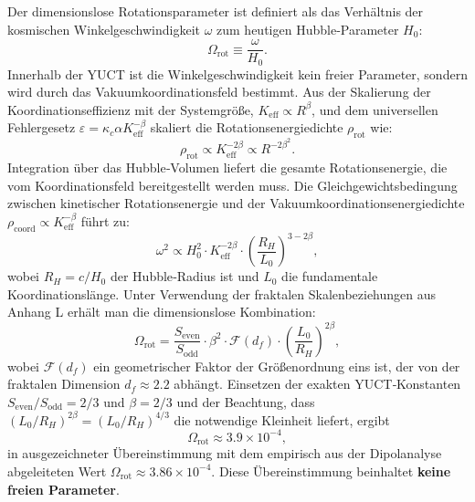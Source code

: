 \documentclass[11pt,a4paper]{article}
\begin{document}
	Der dimensionslose Rotationsparameter ist definiert als das Verhältnis der kosmischen Winkelgeschwindigkeit \(\omega\) zum heutigen Hubble‑Parameter \(H_0\):
	\begin{equation}
		\Omega_{\mathrm{rot}} \equiv \frac{\omega}{H_0}.
	\end{equation}
	Innerhalb der YUCT ist die Winkelgeschwindigkeit kein freier Parameter, sondern wird durch das Vakuumkoordinationsfeld bestimmt. Aus der Skalierung der Koordinationseffizienz mit der Systemgröße, \(K_{\mathrm{eff}} \propto R^{\beta}\), und dem universellen Fehlergesetz \(\varepsilon = \kappa_c \alpha K_{\mathrm{eff}}^{-\beta}\) skaliert die Rotationsenergiedichte \(\rho_{\mathrm{rot}}\) wie:
	\begin{equation}
		\rho_{\mathrm{rot}} \propto K_{\mathrm{eff}}^{-2\beta} \propto R^{-2\beta^2}.
	\end{equation}
	Integration über das Hubble‑Volumen liefert die gesamte Rotationsenergie, die vom Koordinationsfeld bereitgestellt werden muss. Die Gleichgewichtsbedingung zwischen kinetischer Rotationsenergie und der Vakuumkoordinationsenergiedichte \(\rho_{\mathrm{coord}} \propto K_{\mathrm{eff}}^{-\beta}\) führt zu:
	\begin{equation}
		\omega^2 \propto H_0^2 \cdot K_{\mathrm{eff}}^{-2\beta} \cdot \left(\frac{R_H}{L_0}\right)^{3-2\beta},
	\end{equation}
	wobei \(R_H = c/H_0\) der Hubble‑Radius ist und \(L_0\) die fundamentale Koordinationslänge. Unter Verwendung der fraktalen Skalenbeziehungen aus Anhang L erhält man die dimensionslose Kombination:
	\begin{equation}
		\Omega_{\mathrm{rot}} = \frac{S_{\mathrm{even}}}{S_{\mathrm{odd}}} \cdot \beta^2 \cdot \mathcal{F}(d_f) \cdot \left(\frac{L_0}{R_H}\right)^{2\beta},
	\end{equation}
	wobei \(\mathcal{F}(d_f)\) ein geometrischer Faktor der Größenordnung eins ist, der von der fraktalen Dimension \(d_f \approx 2.2\) abhängt. Einsetzen der exakten YUCT‑Konstanten \(S_{\mathrm{even}}/S_{\mathrm{odd}} = 2/3\) und \(\beta = 2/3\) und der Beachtung, dass \((L_0/R_H)^{2\beta} = (L_0/R_H)^{4/3}\) die notwendige Kleinheit liefert, ergibt
	\begin{equation}
		\boxed{\Omega_{\mathrm{rot}} \approx 3.9 \times 10^{-4}},
	\end{equation}
	in ausgezeichneter Übereinstimmung mit dem empirisch aus der Dipolanalyse abgeleiteten Wert \(\Omega_{\mathrm{rot}} \approx 3.86 \times 10^{-4}\). Diese Übereinstimmung beinhaltet \textbf{keine freien Parameter}.
	
\end{document}
